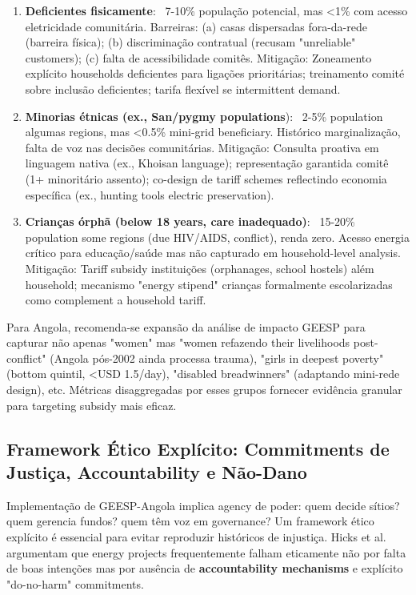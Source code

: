 \documentclass[12pt, a4paper]{article}
\begin{document}
{{{{{{{{{{{{\begin{enumerate}
\item \textbf{Deficientes fisicamente}: ~7-10\% população potencial, mas <1\% com acesso eletricidade comunitária. Barreiras: (a) casas dispersadas fora-da-rede (barreira física); (b) discriminação contratual (recusam "unreliable" customers); (c) falta de acessibilidade comitês. Mitigação: Zoneamento explícito households deficientes para ligações prioritárias; treinamento comité sobre inclusão deficientes; tarifa flexível se intermittent demand.

\item \textbf{Minorias étnicas (ex., San/pygmy populations}): ~2-5\% population algumas regions, mas <0.5\% mini-grid beneficiary. Histórico marginalização, falta de voz nas decisões comunitárias. Mitigação: Consulta proativa em linguagem nativa (ex., Khoisan language); representação garantida comitê (1+ minoritário assento); co-design de tariff schemes reflectindo economia específica (ex., hunting tools electric preservation).

\item \textbf{Crianças órphã (below 18 years, care inadequado)}: ~15-20\% population some regions (due HIV/AIDS, conflict), renda zero. Acesso energia crítico para educação/saúde mas não capturado em household-level analysis. Mitigação: Tariff subsidy instituições (orphanages, school hostels) além household; mecanismo "energy stipend" crianças formalmente escolarizadas como complement a household tariff.
\end{enumerate}

Para Angola, recomenda-se expansão da análise de impacto GEESP para capturar não apenas "women" mas "women refazendo their livelihoods post-conflict" (Angola pós-2002 ainda processa trauma), "girls in deepest poverty" (bottom quintil, <USD 1.5/day), "disabled breadwinners" (adaptando mini-rede design), etc. Métricas disaggregadas por esses grupos fornecer evidência granular para targeting subsidy mais eficaz.

\subsection{Framework Ético Explícito: Commitments de Justiça, Accountability e Não-Dano}

Implementação de GEESP-Angola implica agency de poder: quem decide sítios? quem gerencia fundos? quem têm voz em governance? Um framework ético explícito é essencial para evitar reproduzir históricos de injustiça. Hicks et al.~\citep{Hicks2025} argumentam que energy projects frequentemente falham eticamente não por falta de boas intenções mas por ausência de \textbf{accountability mechanisms} e explícito "do-no-harm" commitments.

}}}}}}}}}}}}
\end{document}
